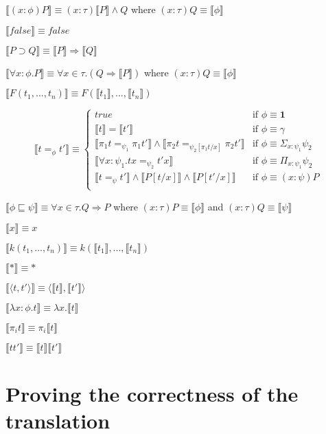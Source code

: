 \documentclass[12pt,a4paper,titlepage]{article}
\newcommand{\bbrackets}[1]{\llbracket #1 \rrbracket}
\begin{document}
    $\bbrackets{(x: \phi)P} \equiv (x: \tau) \bbrackets{P} \land Q$ where $(x: \tau)Q \equiv \bbrackets{\phi}$

    $\bbrackets{false} \equiv false$

    $\bbrackets{P \supset Q} \equiv \bbrackets{P} \Rightarrow \bbrackets{Q}$

    $\bbrackets{\forall x : \phi . P} \equiv \forall x \in \tau . (Q \Rightarrow \bbrackets{P})$ where $(x: \tau) Q \equiv \bbrackets{\phi}$

    $\bbrackets{F(t_1, ..., t_n)} \equiv F(\bbrackets{t_1}, ..., \bbrackets{t_n})$

    \[
        \bbrackets{t =_\phi t'} \equiv \begin{cases}
            true & \text{if }\phi \equiv \textbf{1}\\
            \bbrackets{t} = \bbrackets{t'} & \text{if }\phi \equiv \gamma\\
            \bbrackets{\pi_1 t =_{\psi_1} \pi_1 t'} \land \bbrackets{\pi_2 t =_{\psi_2[\pi_1 t / x]} \pi_2 t'} & \text{if }\phi \equiv \Sigma_{x:\psi_1} \psi_2\\
            \bbrackets{\forall x : \psi_1 . tx =_{\psi_2} t'x} & \text{if }\phi \equiv \Pi_{x: \psi_1} \psi_2\\
            \bbrackets{t =_\psi t'} \land \bbrackets{P[t/x]} \land \bbrackets{P[t'/x]} & \text{if }\phi \equiv (x: \psi)P\\
        \end{cases}
    \]

    $\bbrackets{\phi \sqsubseteq \psi} \equiv \forall x \in \tau . Q \Rightarrow P$ where $(x: \tau)P \equiv \bbrackets{\phi}$ and $(x: \tau)Q \equiv \bbrackets{\psi}$

    $\bbrackets{x} \equiv x$

    $\bbrackets{k(t_1, ..., t_n)} \equiv k(\bbrackets{t_1}, ..., \bbrackets{t_n})$

    $\bbrackets{*} \equiv *$

    $\bbrackets{\langle t, t' \rangle} \equiv \langle \bbrackets{t}, \bbrackets{t'} \rangle$

    $\bbrackets{\lambda x : \phi . t} \equiv \lambda x . \bbrackets{t}$

    $\bbrackets{\pi_i t} \equiv \pi_i \bbrackets{t}$

    $\bbrackets{tt'} \equiv \bbrackets{t} \bbrackets{t'}$

    \section{Proving the correctness of the translation}
\end{document}
